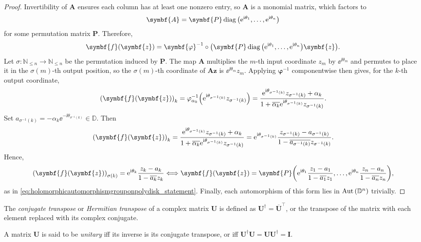 \begin{proof}
    Invertibility of \(\symbf{A}\) ensures each column has at least one nonzero entry, so \(\symbf{A}\) is a monomial matrix, which factors to
    \[\symbf{A}=\symbf{P}\operatorname{diag}\qty(\ee^{\ii\theta_1},\ldots,\ee^{\ii\theta_n})\]
    for some permutation matrix \(\symbf{P}\). Therefore,
    \[\symbf{f}\qty(\symbf{z})=\symbf{\varphi}^{-1}\circ\qty(\symbf{P}\operatorname{diag}\qty(\ee^{\ii\theta_1},\ldots,\ee^{\ii\theta_n})\symbf{z}).\]
    Let \(\sigma:\mathbb{N}_{\leq n}\to\mathbb{N}_{\leq n}\) be the permutation induced by \(\symbf{P}\). The map \(\symbf{A}\) multiplies the \(m\)-th input coordinate \(z_m\) by \(\ee^{\ii\theta_m}\) and permutes to place it in the \(\sigma(m)\)-th output position, so the \(\sigma(m)\)-th coordinate of \(\symbf{A}\symbf{z}\) is \(\ee^{\ii\theta_m}z_m\). Applying \(\symbf{\varphi}^{-1}\) componentwise then gives, for the \(k\)-th output coordinate,
    \[\qty(\symbf{f}\qty(\symbf{z}))_k=\varphi_{\alpha_k}^{-1}\qty(\ee^{\ii\theta_{\sigma^{-1}(k)}}z_{\sigma^{-1}(k)})=\frac{\ee^{\ii\theta_{\sigma^{-1}(k)}}z_{\sigma^{-1}(k)}+\alpha_k}{1+\overline{\alpha_k}\ee^{\ii\theta_{\sigma^{-1}(k)}}z_{\sigma^{-1}(k)}}.\]
    Set \(a_{\sigma^{-1}(k)}=-\alpha_k\ee^{-\ii\theta_{\sigma^{-1}(k)}}\in\mathbb{D}\). Then
    \[\qty(\symbf{f}\qty(\symbf{z}))_k=\frac{\ee^{\ii\theta_{\sigma^{-1}(k)}}z_{\sigma^{-1}(k)}+\alpha_k}{1+\overline{\alpha_k}\ee^{\ii\theta_{\sigma^{-1}(k)}}z_{\sigma^{-1}(k)}}=\ee^{\ii\theta_{\sigma^{-1}(k)}}\frac{z_{\sigma^{-1}(k)}-a_{\sigma^{-1}(k)}}{1-\overline{a_{\sigma^{-1}(k)}}z_{\sigma^{-1}(k)}}.\] Hence, \[\qty(\symbf{f}\qty(\symbf{z}))_{\sigma(k)}=\ee^{\ii\theta_{k}}\frac{z_{k}-a_k}{1-\overline{a_k}z_{k}}\Longleftrightarrow\symbf{f}(\symbf{z})=\symbf{P}\qty(\ee^{\ii\theta_1}\frac{z_1-a_1}{1-\overline{a_1}z_1},\ldots,\ee^{\ii\theta_n}\frac{z_n-a_n}{1-\overline{a_n}z_n}),\]
    as in \cref{eq:holomorphicautomorphismgrouponpolydisk_statement}. Finally, each automorphism of this form lies in \(\operatorname{Aut}\qty(\mathbb{D}^n)\) trivially.
\end{proof}
\begin{definition}
    The \textit{conjugate transpose} or \textit{Hermitian transpose} of a complex matrix \(\symbf{U}\) is defined as \(\symbf{U}^\dagger=\overline{\symbf{U}}^\top\), or the transpose of the matrix with each element replaced with its complex conjugate.
\end{definition}
\begin{definition}
    A matrix \(\symbf{U}\) is said to be \textit{unitary} iff its inverse is its conjugate transpose, or iff \(\symbf{U}^\dagger\symbf{U}=\symbf{U}\symbf{U}^\dagger=\symbf{I}\).
\end{definition}
